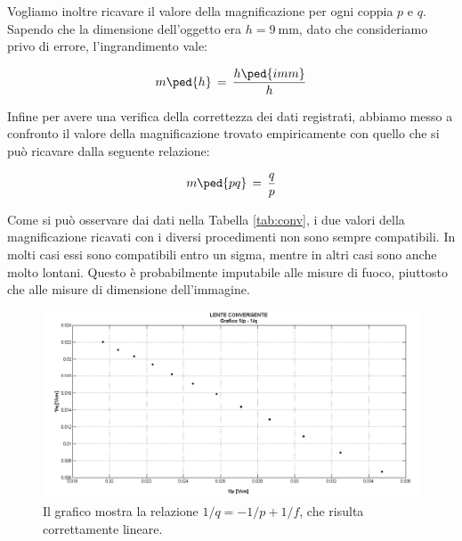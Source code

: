 Vogliamo inoltre ricavare il valore della magnificazione per ogni coppia $p$ e $q$.
Sapendo che la dimensione dell'oggetto era $h = \SI{9}{\milli\metre}$, dato che consideriamo privo di errore, l'ingrandimento vale: 

\begin{equation}
    m\ped{h} \,=\, \frac{h \ped{imm}}{h}
\end{equation}

Infine per avere una verifica della correttezza dei dati registrati, abbiamo messo a confronto il valore della magnificazione trovato empiricamente con quello che si può ricavare dalla seguente relazione:

\begin{equation}
    m\ped{pq} \,=\, \frac{q}{p}
\end{equation}



Come si può osservare dai dati nella Tabella \ref{tab:conv}, i due valori della magnificazione ricavati con i diversi procedimenti
non sono sempre compatibili. In molti casi essi sono compatibili entro un sigma, mentre in altri casi sono anche molto lontani. Questo
è probabilmente imputabile alle misure di fuoco, piuttosto che alle misure di dimensione dell'immagine.

\begin{figure}[H]
    \centering
	\includegraphics[width=16cm]{grafico_convergente.png}
    \caption{Il grafico mostra la relazione $1/q = - 1/p + 1/f$, che risulta correttamente lineare.}
    \label{fig:graph}
\end{figure}

